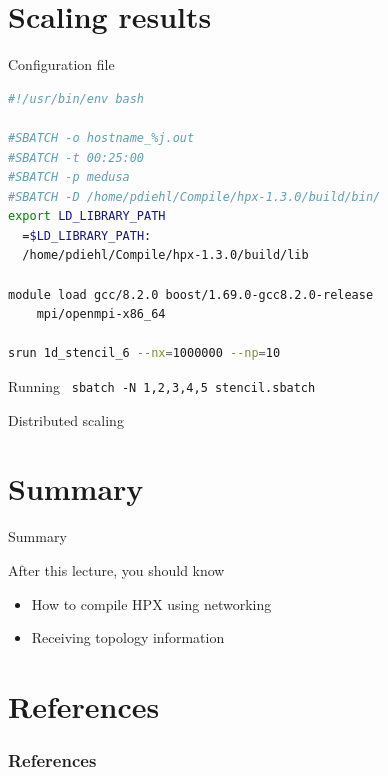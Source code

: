 \documentclass[\classoption]{beamer}
\begin{document}
\section{Scaling results}

\begin{frame}[fragile]{Configuration file}

\begin{lstlisting}[language=bash]
#!/usr/bin/env bash

#SBATCH -o hostname_%j.out
#SBATCH -t 00:25:00
#SBATCH -p medusa
#SBATCH -D /home/pdiehl/Compile/hpx-1.3.0/build/bin/
export LD_LIBRARY_PATH
  =$LD_LIBRARY_PATH:
  /home/pdiehl/Compile/hpx-1.3.0/build/lib

module load gcc/8.2.0 boost/1.69.0-gcc8.2.0-release 
	mpi/openmpi-x86_64   

srun 1d_stencil_6 --nx=1000000 --np=10 
\end{lstlisting}

\begin{block}{Running}
\lstinline| sbatch -N 1,2,3,4,5 stencil.sbatch|
\end{block}

\end{frame}

\begin{frame}{Distributed scaling}

\begin{center}
\end{center}
\end{frame}

\section{Summary}
\begin{frame}{Summary}
\begin{block}{After this lecture, you should know}
\begin{itemize}
\item How to compile HPX using networking
\item Receiving topology information
\end{itemize}
\end{block}
\end{frame}

\section{References}

\begin{frame}[t, allowframebreaks]
\frametitle{References}


\end{frame}
\end{document}
